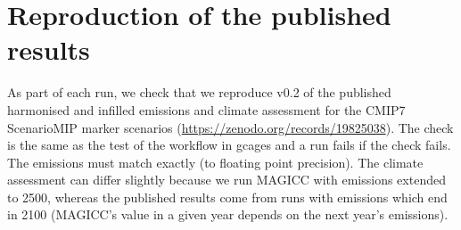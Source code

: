 \section{Reproduction of the published results}
\label{app:reproduction}

As part of each run, we check that we reproduce v0.2 of the published
harmonised and infilled emissions and climate assessment
for the CMIP7 ScenarioMIP marker scenarios (\url{https://zenodo.org/records/19825038}).
The check is the same as the test of the workflow in gcages
and a run fails if the check fails.
The emissions must match exactly (to floating point precision).
The climate assessment can differ slightly because we run MAGICC with emissions extended to 2500,
whereas the published results come from runs with emissions which end in 2100
(MAGICC's value in a given year depends on the next year's emissions).

